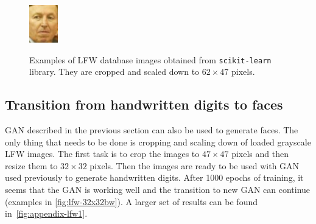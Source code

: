 \begin{figure}[!h]
{        \includegraphics[scale=1]{figures/lfw/lfw64x48color_real8.png}
    }
    \caption{\label{fig:lfw-examples-cropped}Examples of LFW database images obtained from \texttt{scikit-learn} library. They are cropped and scaled down to $62\times 47$ pixels.}
\end{figure}

\subsection*{Transition from handwritten digits to faces}
GAN described in the previous section can also be used to generate faces. The only thing that needs to be done is cropping and scaling down of loaded grayscale LFW images. The first task is to crop the images to $47\times 47$ pixels and then resize them to $32\times 32$ pixels. Then the images are ready to be used with GAN used previously to generate handwritten digits. After 1000 epochs of training, it seems that the GAN is working well and the transition to new GAN can continue (examples in \autoref{fig:lfw-32x32bw}). A larger set of results can be found in~\autoref{fig:appendix-lfw1}.

